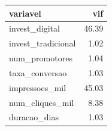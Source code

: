\begin{table}[ht]
\centering
\begin{tabular}{lr}
  \hline
variavel & vif \\ 
  \hline
invest\_digital & 46.39 \\ 
  invest\_tradicional & 1.02 \\ 
  num\_promotores & 1.04 \\ 
  taxa\_conversao & 1.03 \\ 
  impressoes\_mil & 45.03 \\ 
  num\_cliques\_mil & 8.38 \\ 
  duracao\_dias & 1.03 \\ 
   \hline
\end{tabular}
\end{table}
